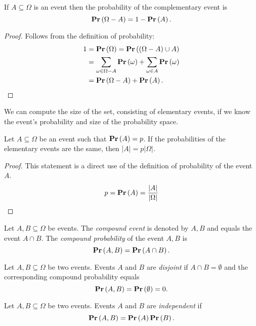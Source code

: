 \begin{corollary}
If $A \subseteq \Omega$ is an event then the probability of the complementary event is 
\[ 
	\mathbf{Pr}\left(\Omega - A\right) = 1 - \mathbf{Pr}\left(A\right) \text{.} 
\] 
\end{corollary}
\begin{proof}
Follows from the definition of probability:
\[
\begin{split}
1 
	& = \mathbf{Pr}\left(\Omega\right) = \mathbf{Pr}\left((\Omega - A) \cup A\right) \\
	& = \displaystyle\sum_{\omega \in \Omega - A} \mathbf{Pr}\left(\omega\right) + \displaystyle\sum_{\omega \in A} \mathbf{Pr}\left(\omega\right) \\
	& = \mathbf{Pr}\left(\Omega - A\right) + \mathbf{Pr}\left(A\right) \text{.}
\end{split}
\]
\end{proof}

We can compute the size of the set, consisting of elementary events, if we know the event's probability and size of the probability space.

\begin{lemma}
Let $A \subseteq \Omega$ be an event such that $\mathbf{Pr}\left(A\right) = p$. If the probabilities of the elementary events are the same, then $|A| = p |\Omega|$.
\end{lemma}
\begin{proof}
This statement is a direct use of the definition of probability of the event $A$.
\[
p = \mathbf{Pr}\left(A\right) = \frac{|A|}{|\Omega|}
\]
\end{proof}

\begin{definition}
Let $A, B \subseteq \Omega$ be events. The \emph{compound event} is denoted by $A, B$ and equals the event $A \cap B$. The \emph{compound probability} of the event $A, B$ is
\[
\mathbf{Pr}\left(A, B\right) = \mathbf{Pr}\left(A \cap B\right) \text{.}
\]
\end{definition}

\begin{definition}
Let $A, B \subseteq \Omega$ be two events. Events $A$ and $B$ are \emph{disjoint} if $A \cap B = \emptyset$ and the corresponding compound probability equals
\[
\mathbf{Pr}\left(A, B\right) = \mathbf{Pr}\left(\emptyset\right) = 0 \text{.}
\]
\end{definition}

\begin{definition}
Let $A, B \subseteq \Omega$ be two events. Events $A$ and $B$ are \emph{independent} if
\[
\mathbf{Pr}\left(A, B\right) = \mathbf{Pr}\left(A\right)\mathbf{Pr}\left(B\right) \text{.}
\]
\end{definition}

